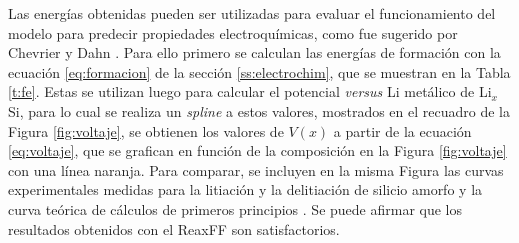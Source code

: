 Las energías obtenidas pueden ser utilizadas para evaluar el funcionamiento del 
modelo para predecir propiedades electroquímicas, como fue sugerido por Chevrier
y Dahn \cite{chevrier2009}. Para ello primero se calculan las energías de formación
con la ecuación \ref{eq:formacion} de la sección \ref{ss:electrochim}, que se muestran
en la Tabla \ref{t:fe}. Estas se utilizan luego para calcular el potencial 
\textit{versus} Li metálico de Li$_x$Si, para lo cual se realiza un \textit{spline} 
a estos valores, mostrados en el recuadro de la Figura \ref{fig:voltaje}, se obtienen
los valores de $V(x)$ a partir de la ecuación \ref{eq:voltaje}, que se grafican en 
función de la composición en la Figura \ref{fig:voltaje} con una línea naranja. Para 
comparar, se incluyen en la misma Figura las curvas experimentales medidas para la
litiación y la delitiación de silicio amorfo \cite{hatchard2004} y la curva teórica 
de cálculos de primeros principios \cite{chevrier2009}. Se puede afirmar que los 
resultados obtenidos con el ReaxFF son satisfactorios.
\begin{table}[h!]
    \centering
    \caption{Energías de formación obtenidas a través de la ecuación \ref{eq:fe}}
    \setlength\extrarowheight{2pt}
    \label{t:fe}
\end{table}
